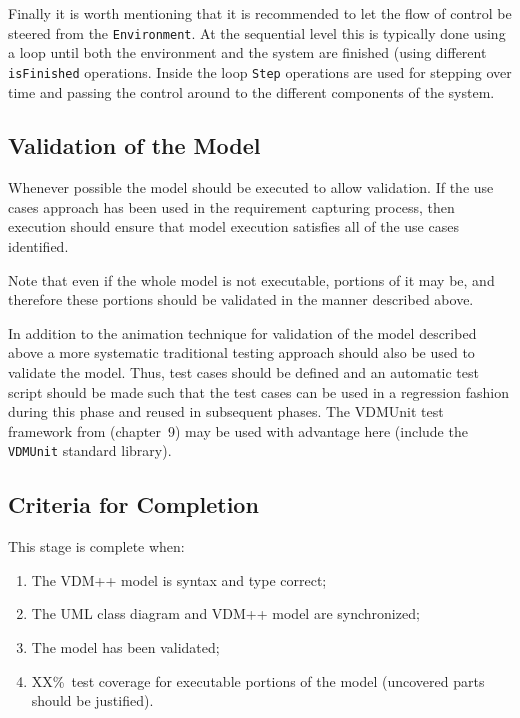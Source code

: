 \documentclass{overturerepchap}
\begin{document}
Finally it is worth mentioning that it is recommended to let the flow of
control be steered from the \texttt{Environment}. At the sequential level
this is typically done using a loop until both the environment and the
system are finished (using different \texttt{isFinished} operations. Inside 
the loop \texttt{Step} operations are used for stepping over time and 
passing the control around to the different components of the system.

\subsection{Validation of the Model}

Whenever possible the model should be executed to allow validation. If
the use cases approach has been used in the requirement capturing
process, then execution should ensure that model execution satisfies
all of the use cases identified.

Note that even if the whole model is not executable, portions of it
may be, and therefore these portions should be validated in the manner
described above.

In addition to the animation technique for validation of the model
described above a more systematic traditional testing approach should
also be used to validate the model.  Thus, test cases should be
defined and an automatic test script should be made such that the test
cases can be used in a regression fashion during this phase and reused
in subsequent phases. The VDMUnit test framework from
\cite{Fitzgerald&05} (chapter~9) may be used with advantage here (include the 
\texttt{VDMUnit} standard library).

\subsection{Criteria for Completion}

This stage is complete when:

\begin{enumerate}
\item The VDM++ model is syntax and type correct;
\item The UML class diagram and VDM++ model are synchronized;
\item The model has been validated;
\item XX\%\ test coverage for executable portions of the model
(uncovered parts should be justified).
\end{enumerate}
\end{document}
